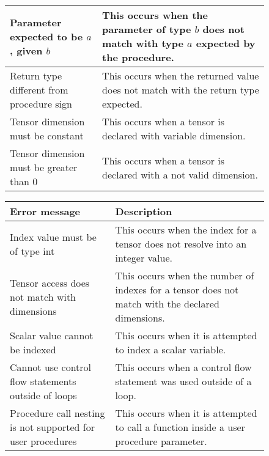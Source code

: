 \begin{figure}[h]
\begin{tabular}{p{1.5in}p{2.5in}}
        \midrule Parameter expected \newline to be $a$, given $b$ &
        This occurs when the parameter of type $b$ does not match with type $a$
        expected by the procedure.\\

        \midrule Return type \newline different from \newline procedure sign &
        This occurs when the returned value does not match with the return
        type expected.\\

        \midrule Tensor dimension must be constant &
	This occurs when a tensor is declared with variable dimension.\\

        \midrule Tensor dimension must be greater than 0 &
	This occurs when a tensor is declared with a not valid dimension.\\

        \bottomrule
    \end{tabular}
\end{figure}

\newpage

\begin{figure}[h]
    \centering
    \begin{tabular}{p{1.5in}p{2.5in}}
        \toprule
        \textbf{Error message} & \textbf{Description}\\

        \midrule Index value must be of type int &
	This occurs when the index for a tensor does not resolve into an
	integer value.\\

        \midrule Tensor access does not match with dimensions &
	This occurs when the number of indexes for a tensor does not match
	with the declared dimensions.\\

        \midrule Scalar value cannot be indexed &
	This occurs when it is attempted to index a scalar variable.\\

        \midrule Cannot use control flow statements outside of loops &
	This occurs when a control flow statement was used outside of a loop.\\

        \midrule Procedure call nesting is not supported for user procedures&
        This occurs when it is attempted to call a function inside a user
        procedure parameter.\\

        \bottomrule
    \end{tabular}
\end{figure}

